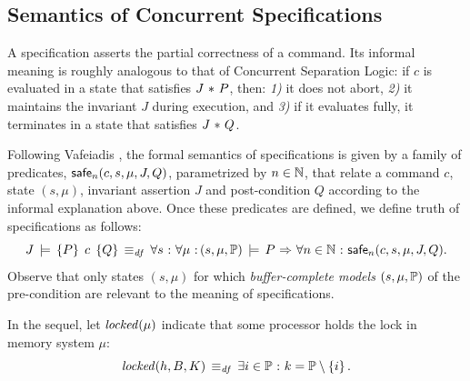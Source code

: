 \documentclass[11pt]{report}         %
\begin{document}
\subsection{Semantics of Concurrent Specifications}
\label{sec:specification-semantics}

A specification asserts the partial correctness of a command. Its informal meaning is roughly analogous to that of Concurrent Separation Logic: if $c$ is evaluated in a state that satisfies $J \operatorname{\,\ast\,} P$, then: \emph{1)} it does not abort, \emph{2)} it maintains the invariant $J$ during execution, and \emph{3)} if it evaluates fully, it terminates in a state that satisfies $J \operatorname{\,\ast\,} Q$. 

Following Vafeiadis \cite{V11}, the formal semantics of specifications is given by a family of predicates, $\mathsf{safe}_{n}(c,s,\mu,J,Q)$, parametrized by $n \in \mathbb{N}$, that relate a command $c$, state $(s,\mu)$, invariant assertion $J$ and post-condition $Q$ according to the informal explanation above. Once these predicates are defined, we define truth of specifications as follows: \[ J\,\models\,\left\lbrace P \right\rbrace\;c\;\left\lbrace Q \right\rbrace \operatorname{\;\equiv_{\mathit{df}}\;} \forall s \operatorname{\,:\,} \forall \mu \operatorname{\,:\,} (s,\mu,\mathbb{P})\,\models\, P \operatorname{\,\Rightarrow\,} \forall n \in \mathbb{N} \operatorname{\,:\,} \mathsf{safe}_{n}(c,s,\mu,J,Q).\] Observe that only states $(s,\mu)$ for which \emph{buffer-complete models} $(s,\mu,\mathbb{P})$ of the pre-condition are relevant to the meaning of specifications. 

In the sequel, let $\mathit{locked}(\mu)$ indicate that some processor holds the lock in memory system $\mu$: \[ \mathit{locked}(h,B,K) \operatorname{\;\equiv_{\mathit{df}}\;} \exists i \in \mathbb{P} \operatorname{\,:\,} k = \mathbb{P} \setminus \left\lbrace i \right\rbrace. \]
\end{document}
